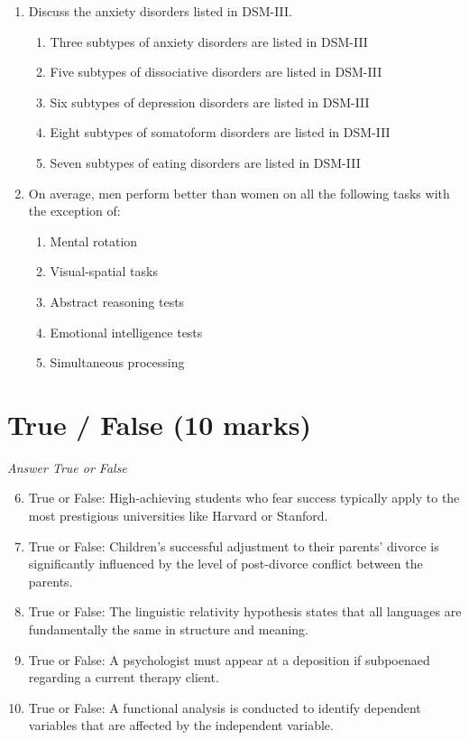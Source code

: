 \documentclass[12pt]{article}
\begin{document}
\begin{enumerate}[label=\arabic*.]
\begin{enumerate}[label=(\alph*)]
\end{enumerate}
\item Discuss the anxiety disorders listed in DSM-III.
\begin{enumerate}[label=(\alph*)]
    \item Three subtypes of anxiety disorders are listed in DSM-III
    \item Five subtypes of dissociative disorders are listed in DSM-III
    \item Six subtypes of depression disorders are listed in DSM-III
    \item Eight subtypes of somatoform disorders are listed in DSM-III
    \item Seven subtypes of eating disorders are listed in DSM-III
\end{enumerate}
\item On average, men perform better than women on all the following tasks with the exception of:
\begin{enumerate}[label=(\alph*)]
    \item Mental rotation
    \item Visual-spatial tasks
    \item Abstract reasoning tests
    \item Emotional intelligence tests
    \item Simultaneous processing
\end{enumerate}
\end{enumerate}

\section*{True / False (10 marks)}
\textit{Answer True or False}
\begin{enumerate}[label=\arabic*.]
\setcounter{enumi}{5}
\item True or False: High-achieving students who fear success typically apply to the most prestigious universities like Harvard or Stanford.
\item True or False: Children's successful adjustment to their parents' divorce is significantly influenced by the level of post-divorce conflict between the parents.
\item True or False: The linguistic relativity hypothesis states that all languages are fundamentally the same in structure and meaning.
\item True or False: A psychologist must appear at a deposition if subpoenaed regarding a current therapy client.
\item True or False: A functional analysis is conducted to identify dependent variables that are affected by the independent variable.
\end{enumerate}
\end{document}

